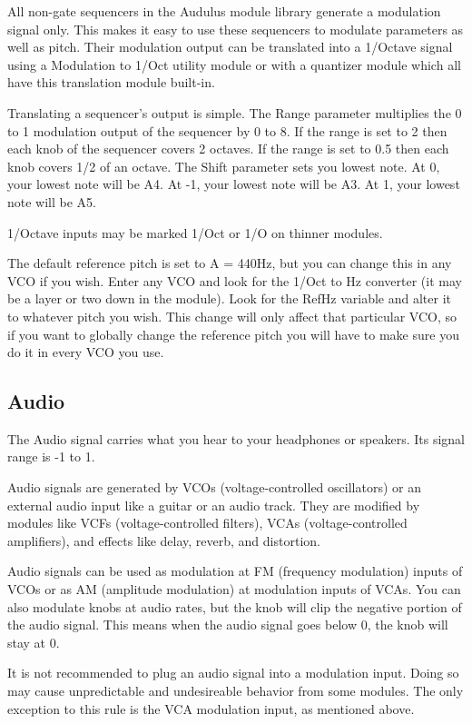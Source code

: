 \documentclass[11pt]{book}
\begin{document}
\begin{multicols*}{2}
All non-gate sequencers in the Audulus module library generate a modulation signal only. This makes it easy to use these sequencers to modulate parameters as well as pitch. Their modulation output can be translated into a 1/Octave signal using a Modulation to 1/Oct utility module or with a quantizer module which all have this translation module built-in.

Translating a sequencer's output is simple. The Range parameter multiplies the 0 to 1 modulation output of the sequencer by 0 to 8. If the range is set to 2 then each knob of the sequencer covers 2 octaves. If the range is set to 0.5 then each knob covers 1/2 of an octave. The Shift parameter sets you lowest note. At 0, your lowest note will be A4. At -1, your lowest note will be A3. At 1, your lowest note will be A5.

1/Octave inputs may be marked 1/Oct or 1/O on thinner modules.

The default reference pitch is set to A = 440Hz, but you can change this in any VCO if you wish. Enter any VCO and look for the 1/Oct to Hz converter (it may be a layer or two down in the module). Look for the RefHz variable and alter it to whatever pitch you wish. This change will only affect that particular VCO, so if you want to globally change the reference pitch you will have to make sure you do it in every VCO you use.

\subsection{Audio}

The Audio signal carries what you hear to your headphones or speakers. Its signal range is -1 to 1.

Audio signals are generated by VCOs (voltage-controlled oscillators) or an external audio input like a guitar or an audio track. They are modified by modules like VCFs (voltage-controlled filters), VCAs (voltage-controlled amplifiers), and effects like delay, reverb, and distortion.

Audio signals can be used as modulation at FM (frequency modulation) inputs of VCOs or as AM (amplitude modulation) at modulation inputs of VCAs. You can also modulate knobs at audio rates, but the knob will clip the negative portion of the audio signal. This means when the audio signal goes below 0, the knob will stay at 0. 

It is not recommended to plug an audio signal into a modulation input. Doing so may cause unpredictable and undesireable behavior from some modules. The only exception to this rule is the VCA modulation input, as mentioned above.


\end{multicols*}
\end{document}
